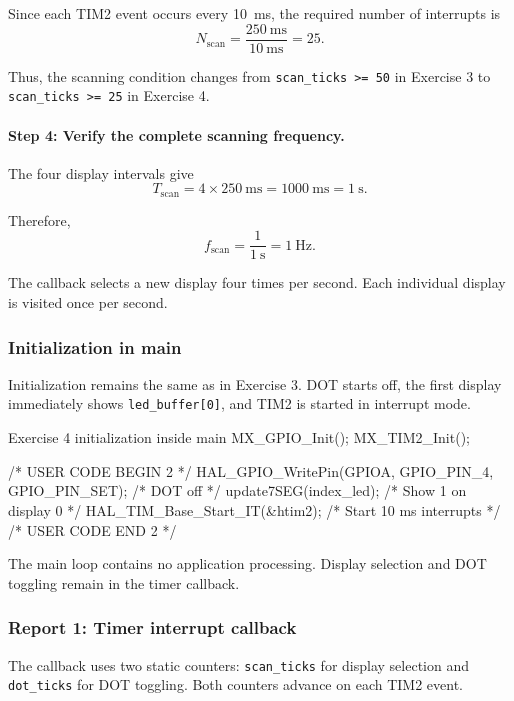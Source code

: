 \documentclass[a4paper]{article}
\begin{document}
Since each TIM2 event occurs every 10~ms,
the required number of interrupts is
\[
    N_{\mathrm{scan}}
    = \frac{250~\mathrm{ms}}{10~\mathrm{ms}}
    = 25.
\]

Thus, the scanning condition changes from
\texttt{scan\_ticks >= 50} in Exercise 3 to
\texttt{scan\_ticks >= 25} in Exercise 4.

\paragraph{Step 4: Verify the complete scanning frequency.}

The four display intervals give
\[
    T_{\mathrm{scan}}
    = 4 \times 250~\mathrm{ms}
    = 1000~\mathrm{ms}
    = 1~\mathrm{s}.
\]

Therefore,
\[
    \boxed{
        f_{\mathrm{scan}}
        = \frac{1}{1~\mathrm{s}}
        = 1~\mathrm{Hz}
    }.
\]

The callback selects a new display four times
per second. Each individual display is visited
once per second.

\subsubsection{Initialization in main}

Initialization remains the same as in Exercise 3.
DOT starts off, the first display immediately
shows \texttt{led\_buffer[0]}, and TIM2 is
started in interrupt mode.

\begin{stmcode}{Exercise 4 initialization inside main}
MX_GPIO_Init();
MX_TIM2_Init();

/* USER CODE BEGIN 2 */
HAL_GPIO_WritePin(GPIOA, GPIO_PIN_4, GPIO_PIN_SET); /* DOT off */
update7SEG(index_led);                              /* Show 1 on display 0 */
HAL_TIM_Base_Start_IT(&htim2);                       /* Start 10 ms interrupts */
/* USER CODE END 2 */
\end{stmcode}

The main loop contains no application processing.
Display selection and DOT toggling remain in
the timer callback.

\subsubsection{Report 1: Timer interrupt callback}

The callback uses two static counters:
\texttt{scan\_ticks} for display selection and
\texttt{dot\_ticks} for DOT toggling. Both
counters advance on each TIM2 event.
\end{document}
